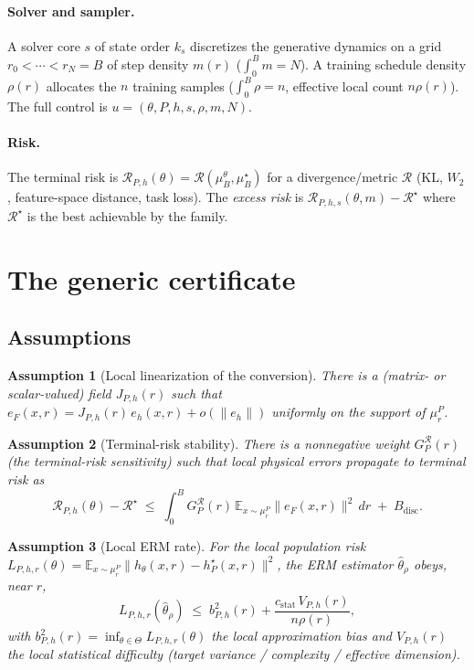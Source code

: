 \documentclass[11pt]{article}
\newtheorem{assumption}{Assumption}
\newcommand{\R}{\mathcal R}
\newcommand{\E}{\mathbb E}
\newcommand{\norm}[1]{\lVert #1 \rVert}
\begin{document}
\paragraph{Solver and sampler.}
A solver core $s$ of state order $k_s$ discretizes the generative
dynamics on a grid $r_0<\cdots<r_N=B$ of step density $m(r)$
($\int_0^B m=N$). A training schedule density $\rho(r)$ allocates the $n$
training samples ($\int_0^B\rho=n$, effective local count $n\rho(r)$).
The full control is $u=(\theta,P,h,s,\rho,m,N)$.

\paragraph{Risk.}
The terminal risk is $\R_{P,h}(\theta)=\R(\mu_B^\theta,\mu_B^\star)$ for a
divergence/metric $\R$ (KL, $W_2$, feature-space distance, task loss).
The \emph{excess risk} is $\R_{P,h,s}(\theta,m)-\R^\star$ where $\R^\star$
is the best achievable by the family.

\section{The generic certificate}
\label{sec:generic}

\subsection{Assumptions}

\begin{assumption}[Local linearization of the conversion]\label{as:lin}
There is a (matrix- or scalar-valued) field $J_{P,h}(r)$ such that
$e_F(x,r)=J_{P,h}(r)\,e_h(x,r)+o(\norm{e_h})$ uniformly on the support of
$\mu_r^P$.
\end{assumption}

\begin{assumption}[Terminal-risk stability]\label{as:stab}
There is a nonnegative weight $G_P^\R(r)$ (the \emph{terminal-risk
sensitivity}) such that local physical errors propagate to terminal risk
as
\[
\R_{P,h}(\theta)-\R^\star \;\le\;
\int_0^B G_P^\R(r)\,\E_{x\sim\mu_r^P}\norm{e_F(x,r)}^2\,dr \;+\; B_{\mathrm{disc}} .
\]
\end{assumption}

\begin{assumption}[Local ERM rate]\label{as:erm}
For the local population risk
$L_{P,h,r}(\theta)=\E_{x\sim\mu_r^P}\norm{h_\theta(x,r)-h_P^\star(x,r)}^2$,
the ERM estimator $\hat\theta_\rho$ obeys, near $r$,
\[
L_{P,h,r}(\hat\theta_\rho)\;\le\; b_{P,h}^2(r)+\frac{c_{\mathrm{stat}}\,V_{P,h}(r)}{n\rho(r)},
\]
with $b_{P,h}^2(r)=\inf_{\theta\in\Theta}L_{P,h,r}(\theta)$ the local
approximation bias and $V_{P,h}(r)$ the local statistical difficulty
(target variance / complexity / effective dimension).
\end{assumption}
\end{document}
